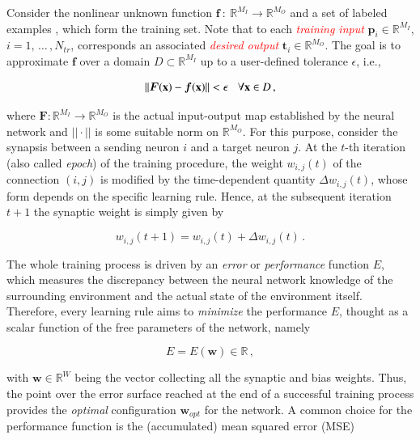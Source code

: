 \documentclass[longtitle]{elsarticle}
\numberwithin{equation}{section}
\theoremstyle{theorem}
\theoremstyle{definition}
\theoremstyle{remark}
\theoremstyle{proposition}
\numberwithin{figure}{section}
\newcommand{\bg}[1]{\boldsymbol{#1}}
\begin{document}
		Consider the nonlinear unknown function $\bg{f} ~ : ~ \mathbb{R}^{M_I} \rightarrow \mathbb{R}^{M_O}$ and a set of labeled examples \smash{$\big\lbrace \mathbf{p}_i, \mathbf{t}_i = \bg{f}(\mathbf{p}_i)\big\rbrace_{1 \leq i \leq N_{tr}}$}, which form the training set. Note that to each \textcolor{red}{\emph{training input}} $\mathbf{p}_i \in \mathbb{R}^{M_I}$, $i = 1, \, \ldots \, , N_{tr}$, corresponds an associated \textcolor{red}{\emph{desired output}} $\mathbf{t}_i \in \mathbb{R}^{M_O}$. The goal is to approximate $\bg{f}$ over a domain $D \subset \mathbb{R}^{M_I}$ up to a user-defined tolerance $\epsilon$, i.e.,
		\begin{linenomath}\begin{equation*}
			||\bg{F}(\mathbf{x}) - \boldsymbol{f}(\mathbf{x})|| < \epsilon \hspace*{0.3cm} \text{$\forall \mathbf{x} \in D$} \, ,
		\end{equation*}\end{linenomath}
		where $\bg{F} : \mathbb{R}^{M_I} \rightarrow \mathbb{R}^{M_O}$ is the actual input-output map established by the neural network and $||\cdot||$ is some suitable norm on $\mathbb{R}^{M_O}$. For this purpose, consider the synapsis between a sending neuron $i$ and a target neuron $j$. At the $t$-th iteration (also called \emph{epoch}) of the training procedure, the weight $w_{i,j}(t)$ of the connection $(i,j)$ is modified by the time-dependent quantity $\Delta w_{i,j}(t)$, whose form depends on the specific learning rule. Hence, at the subsequent iteration $t+1$ the synaptic weight is simply given by
		\begin{linenomath}\begin{equation*}
			w_{i,j}(t+1) = w_{i,j}(t) + \Delta w_{i,j}(t) \, .
		\end{equation*}\end{linenomath}
		The whole training process is driven by an \emph{error} or \emph{performance} function $E$, which measures the discrepancy between the neural network knowledge of the surrounding environment and the actual state of the environment itself. Therefore, every learning rule aims to \emph{minimize} the performance $E$, thought as a scalar function of the free parameters of the network, namely 
		\begin{linenomath}\begin{equation*}
			E = E(\mathbf{w}) \in \mathbb{R} \, , 
		\end{equation*}\end{linenomath}
		with $\mathbf{w} \in \mathbb{R}^{W}$ being the vector collecting all the synaptic and bias weights. Thus, the point over the error surface reached at the end of a successful training process provides the \emph{optimal} configuration $\mathbf{w}_{opt}$ for the network. A common choice for the performance function is the (accumulated) mean squared error (MSE)
\end{document}
